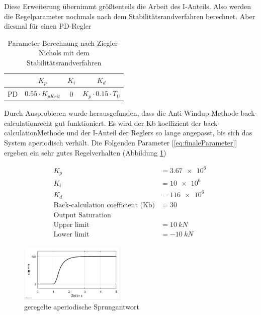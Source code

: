 Diese Erweiterung übernimmt größtenteils die Arbeit des I-Anteils. Also werden die Regelparameter nochmals nach dem Stabilitätsrandverfahren 
berechnet. Aber diesmal für einen PD-Regler

\begin{table}[hb]

\normalsize

\caption{Parameter-Berechnung nach Ziegler-Nichols mit dem Stabilitätsrandverfahren}

\label{tbl:PID}

\centering

\begin{tabular}{c|c|c|c}

& $K_p$ & $K_i$ & $K_d$\\

\hline

PD & $0.55 \cdot K_{pKrit}$ & $0$ & $K_p \cdot 0.15 \cdot T_U$\\

\end{tabular}

\end{table}


	Durch Ausprobieren wurde herausgefunden, dass die Anti-Windup Methode \glqq back-calculation\grqq  recht gut funktioniert.
	Es wird der Kb koeffizient der \glqq back-calculation\grqq  Methode und der I-Anteil der Reglers so lange angepasst, bis sich
	das System aperiodisch verhält. Die Folgenden Parameter [\ref{eq:finaleParameter}] ergeben ein sehr gutes Regelverhalten (Abbildung \ref{wunderSchoeneSprungantwort}) 


	\begin{equation}
		\label{eq:finaleParameter}
		\begin{split}
		K_p &= \SI{3,67e6}{}\\
		K_i &= \SI{10e6}{}\\
		K_d &= \SI{116e6}{}\\
		\text{Back-calculation coefficient (Kb)} &= 30\\
			\text{Output Saturation}\\
		\text{Upper limit} &= \SI{10}{kN}\\
		\text{Lower limit} &= \SI{-10}{kN}\\
		\end{split}
	\end{equation}


	\begin{figure}[h] 
		\centering
			\includegraphics[width=0.45\textwidth]{Bilder/geregelteStepresponseSchoen.PNG}
		\caption{geregelte aperiodische Sprungantwort}
		\label{wunderSchoeneSprungantwort}
	\end{figure}

